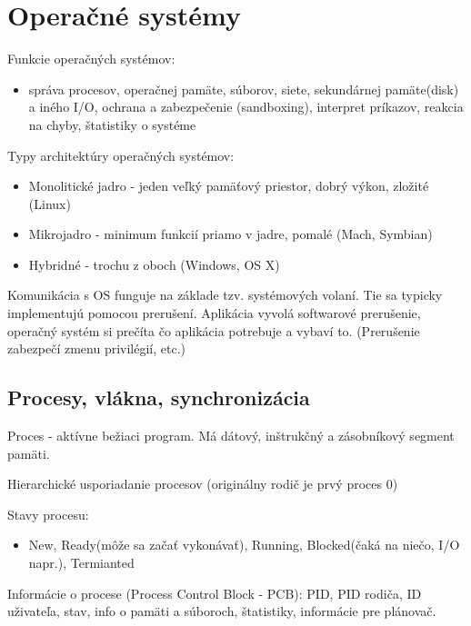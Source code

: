 \documentclass[a4paper,10pt]{article}
\begin{document}
\section{Operačné systémy}

\begin{multicols}{2}

	Funkcie operačných systémov:
	
	\begin{itemize}
		\item správa procesov, operačnej pamäte, súborov, siete, sekundárnej pamäte(disk) a iného I/O, ochrana a zabezpečenie (sandboxing), interpret príkazov, reakcia na chyby, štatistiky o systéme
	\end{itemize}		
	
	Typy architektúry operačných systémov:
	
	\begin{itemize}
		\item Monolitické jadro - jeden veľký pamäťový priestor, dobrý výkon, zložité (Linux)
		\item Mikrojadro - minimum funkcií priamo v jadre, pomalé (Mach, Symbian)
		\item Hybridné - trochu z oboch (Windows, OS X)
	\end{itemize}
	
	Komunikácia s OS funguje na základe tzv. systémových volaní. Tie sa typicky implementujú pomocou prerušení. Aplikácia vyvolá softwarové prerušenie, operačný systém si prečíta čo aplikácia potrebuje a vybaví to. (Prerušenie zabezpečí zmenu privilégií, etc.)
	
	\subsection{Procesy, vlákna, synchronizácia}
	
	Proces - aktívne bežiaci program. Má dátový, inštrukčný a zásobníkový segment pamäti.
	
	Hierarchické usporiadanie procesov (originálny rodič je prvý proces 0)
	
	Stavy procesu: 
	
	\begin{itemize}
		\item New, Ready(môže sa začať vykonávať), Running, Blocked(čaká na niečo, I/O napr.), Termianted
	\end{itemize}
	
	Informácie o procese (Process Control Block - PCB): PID, PID rodiča, ID uživateľa, stav, info o pamäti a súboroch, štatistiky, informácie pre plánovač.
	

\end{multicols}
\end{document}
